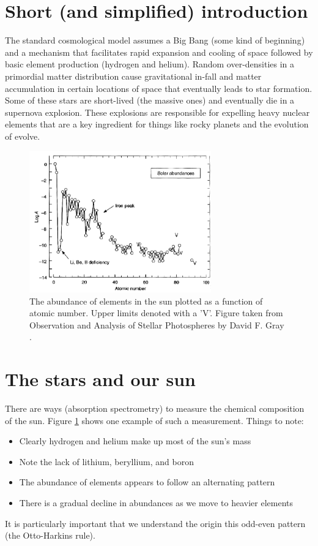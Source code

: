 \documentclass[a4paper,12pt]{article}
\theoremstyle{remark}
\renewcommand{\=}[1]{\stackrel{#1}{=}} %
\theoremstyle{plain}
\theoremstyle{definition}
\begin{document}
\section{Short (and simplified) introduction}
The standard cosmological model assumes a Big Bang (some kind of beginning) and a mechanism that facilitates rapid expansion and cooling of space followed by basic element production (hydrogen and helium). Random over-densities in a primordial matter distribution cause gravitational in-fall and matter accumulation in certain locations of space that eventually leads to star formation. Some of these stars are short-lived (the massive ones) and eventually die in a supernova explosion. These explosions are responsible for expelling heavy nuclear elements that are a key ingredient for things like rocky planets and the evolution of evolve. %

\begin{figure}[t]
\begin{center}
    \includegraphics*[angle=0,width=0.7\textwidth]{img/chemical_distribution3.png}
    \caption[Distribution of chemicals in the sun]{The abundance of elements in the sun plotted as a function of atomic number. Upper limits denoted with a 'V'. Figure taken from Observation and Analysis of Stellar Photospheres by David F. Gray \cite{Gray2005}.}
\label{fig:chemica_dist}
\end{center}
\end{figure}

\section{The stars and our sun}
There are ways (absorption spectrometry) to measure the chemical composition of the sun. Figure \ref{fig:chemica_dist} shows one example of such a measurement. Things to note:
\begin{itemize}
\item Clearly hydrogen and helium make up most of the sun's mass
\item Note the lack of lithium, beryllium, and boron
\item The abundance of elements appears to follow an alternating pattern
\item There is a gradual decline in abundances as we move to heavier elements
\end{itemize}
It is particularly important that we understand the origin this odd-even pattern (the Otto-Harkins rule). 
\end{document}
